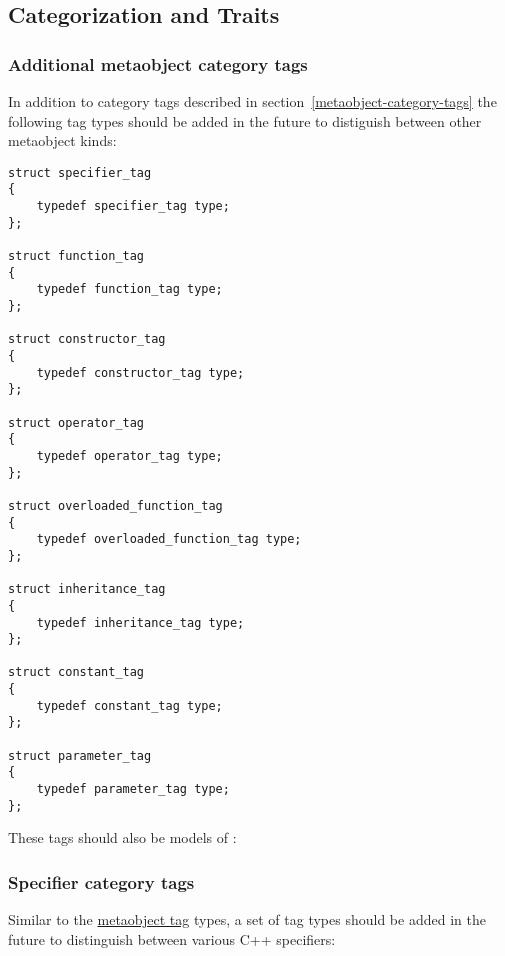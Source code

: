 \subsection{Categorization and Traits}

\subsubsection{Additional metaobject category tags}
\label{metaobject-category-tags-next}

In addition to category tags described in section~\ref{metaobject-category-tags}
the following tag types should be added in the future
to distiguish between other metaobject kinds:

\begin{verbatim}
struct specifier_tag
{
	typedef specifier_tag type;
};

struct function_tag
{
	typedef function_tag type;
};

struct constructor_tag
{
	typedef constructor_tag type;
};

struct operator_tag
{
	typedef operator_tag type;
};

struct overloaded_function_tag
{
	typedef overloaded_function_tag type;
};

struct inheritance_tag
{
	typedef inheritance_tag type;
};

struct constant_tag
{
	typedef constant_tag type;
};

struct parameter_tag
{
	typedef parameter_tag type;
};
\end{verbatim}

These tags should also be models of \verb@MetaobjectCategory@:

\subsubsection{Specifier category tags}
\label{specifier-category-tags}

Similar to the \hyperref[metaobject-category-tags]{metaobject tag} types,
a set of tag types should be added in the future
to distinguish between various C++ specifiers:

